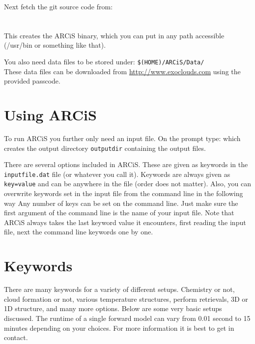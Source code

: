 \documentclass[12pt]{article}
\begin{document}
Next fetch the git source code from:
%
\vspace{-2cm}\\
\vspace{-2cm}\\
\vspace{-2cm}\\
%
This creates the ARCiS binary, which you can put in any path accessible (/usr/bin or something like that).

You also need data files to be stored under: \texttt{\$(HOME)/ARCiS/Data/}\\
These data files can be downloaded from \url{http://www.exoclouds.com} using the provided passcode.

\section{Using ARCiS}

To run ARCiS you further only need an input file. On the prompt type:
%
%
which creates the output directory \texttt{outputdir} containing the output files.

There are several options included in ARCiS. These are given as keywords in the \texttt{inputfile.dat} file (or whatever you call it). Keywords are always given as \texttt{key=value} and can be anywhere in the file (order does not matter). Also, you can overwrite keywords set in the input file from the command line in the following way
%
%
Any number of keys can be set on the command line. Just make sure the first argument of the command line is the name of your input file. Note that ARCiS always takes the last keyword value it encounters, first reading the input file, next the command line keywords one by one.

\section{Keywords}

There are many keywords for a variety of different setups. Chemistry or not, cloud formation or not, various temperature structures, perform retrievals, 3D or 1D structure, and many more options. Below are some very basic setups discussed. The runtime of a single forward model can vary from 0.01 second to 15 minutes depending on your choices. For more information it is best to get in contact.
\end{document}
